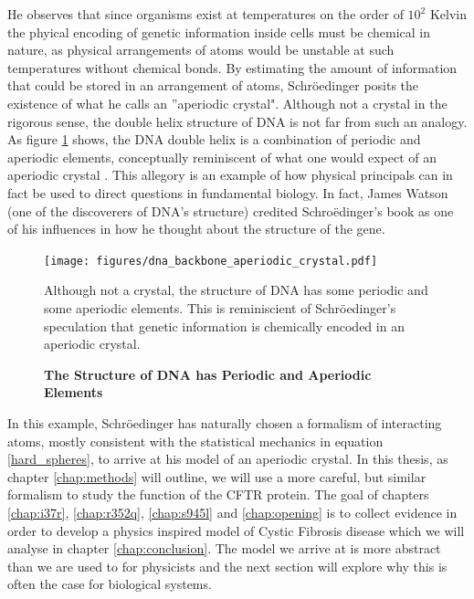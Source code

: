 He observes that since organisms exist at temperatures on the order of $10^2 $ Kelvin the phyical encoding of genetic information inside cells must be chemical in nature, as physical arrangements of atoms would be unstable at such temperatures without chemical bonds. By estimating the amount of information that could be stored in an arrangement of atoms, Schr\"oedinger posits the existence of what he calls an ''aperiodic crystal". Although not a crystal in the rigorous sense, the double helix structure of DNA is not far from such an analogy. As figure \ref{dna_structure} shows, the DNA double helix is a combination of periodic and aperiodic elements, conceptually reminiscent of what one would expect of an aperiodic crystal \cite{varn2016}. This allegory is an example of how physical principals can in fact be used to direct questions in fundamental biology. In fact, James Watson (one of the discoverers of DNA's structure) credited Schro\"edinger's book as one of his influences in how he thought about the structure of the gene.

\begin{figure}
	\begin{center}
		\texttt{[image: figures/dna\_backbone\_aperiodic\_crystal.pdf]}
	\end{center}
	\captionsetup{singlelinecheck = false, justification=raggedright}
	\caption[The Structure of DNA has Periodic and Aperiodic Elements] {\textbf{The Structure of DNA has Periodic and Aperiodic Elements}}{Although not a crystal, the structure of DNA has some periodic and some aperiodic elements. This is reminiscient of Schr\"oedinger's speculation that genetic information is chemically encoded in an aperiodic crystal. }
	\label{dna_structure}
\end{figure}

In this example, Schr\"oedinger has naturally chosen a formalism of interacting atoms, mostly consistent with the statistical mechanics in equation \ref{hard_spheres}, to arrive at his model of an aperiodic crystal. In this thesis, as chapter \ref{chap:methods} will outline, we will use a more careful, but similar formalism to study the function of the CFTR protein. The goal of chapters \ref{chap:i37r}, \ref{chap:r352q}, \ref{chap:s945l} and \ref{chap:opening} is to collect evidence in order to develop a physics inspired model of Cystic Fibrosis disease which we will analyse in chapter \ref{chap:conclusion}. The model we arrive at is more abstract than we are used to for physicists and the next section will explore why this is often the case for biological systems.
 
